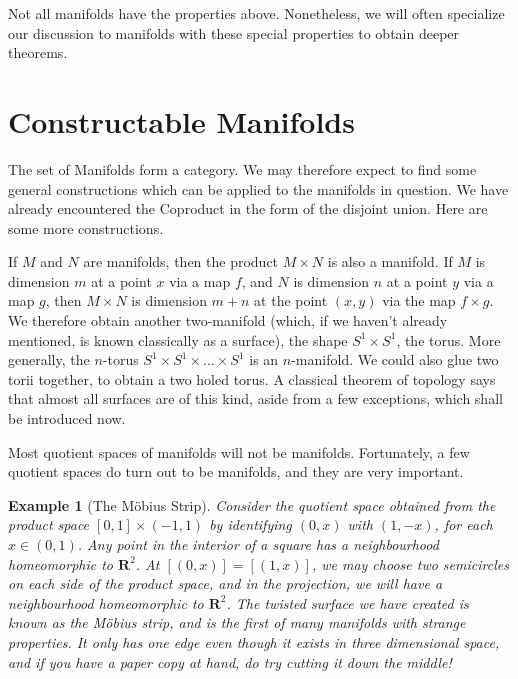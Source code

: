 \documentclass[12pt]{report}
\theoremstyle{plain}
\newtheorem*{example}{Example}
\theoremstyle{definition}
\begin{document}
Not all manifolds have the properties above. Nonetheless, we will often specialize our discussion to manifolds with these special properties to obtain deeper theorems.

\section{Constructable Manifolds}

The set of Manifolds form a category. We may therefore expect to find some general constructions which can be applied to the manifolds in question. We have already encountered the Coproduct in the form of the disjoint union. Here are some more constructions.

If $M$ and $N$ are manifolds, then the product $M \times N$ is also a manifold. If $M$ is dimension $m$ at a point $x$ via a map $f$, and $N$ is dimension $n$ at a point $y$ via a map $g$, then $M \times N$ is dimension $m + n$ at the point $(x,y)$ via the map $f \times g$. We therefore obtain another two-manifold (which, if we haven't already mentioned, is known classically as a surface), the shape $S^1 \times S^1$, the torus. More generally, the $n$-torus $S^1 \times S^1 \times \dots \times S^1$ is an $n$-manifold. We could also glue two torii together, to obtain a two holed torus. A classical theorem of topology says that almost all surfaces are of this kind, aside from a few exceptions, which shall be introduced now.

Most quotient spaces of manifolds will not be manifolds. Fortunately, a few quotient spaces do turn out to be manifolds, and they are very important.

\begin{example}[The M\"{o}bius Strip]
    Consider the quotient space obtained from the product space $[0,1] \times (-1,1)$ by identifying $(0,x)$ with $(1,-x)$, for each $x \in (0,1)$. Any point in the interior of a square has a neighbourhood homeomorphic to $\mathbf{R}^2$. At $[(0,x)] = [(1,x)]$, we may choose two semicircles on each side of the product space, and in the projection, we will have a neighbourhood homeomorphic to $\mathbf{R}^2$. The twisted surface we have created is known as the M\"{o}bius strip, and is the first of many manifolds with strange properties. It only has one edge even though it exists in three dimensional space, and if you have a paper copy at hand, do try cutting it down the middle!
\end{example}
\end{document}
